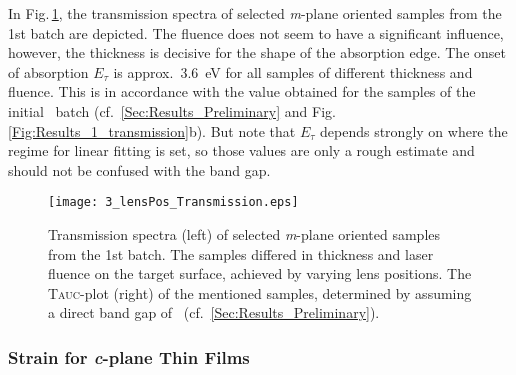 In Fig.\,\ref{Fig:Results_3_lensTransmission}, the transmission spectra of selected \textit{m}-plane oriented samples from the 1st batch are depicted.
The fluence does not seem to have a significant influence, however, the thickness is decisive for the shape of the absorption edge.
The onset of absorption $E_\tau$ is approx.\ \qty{3.6}{\eV} for all samples of different thickness and fluence.
This is in accordance with the value obtained for the samples of the initial \cro\ batch (cf.~\ref{Sec:Results_Preliminary} and Fig.\,\ref{Fig:Results_1_transmission}b).
But note that $E_\tau$ depends strongly on where the regime for linear fitting is set, so those values are only a rough estimate and should not be confused with the band gap.

\begin{figure}
    \centering
    \texttt{[image: 3\_lensPos\_Transmission.eps]}
    \caption{
        Transmission spectra (left) of selected \textit{m}-plane oriented samples from the 1st batch.
        The samples differed in thickness and laser fluence on the target surface, achieved by varying lens positions.
        The \textsc{Tauc}-plot (right) of the mentioned samples, determined by assuming a direct band gap of \cro\ (cf.~\ref{Sec:Results_Preliminary}).
    }
    \label{Fig:Results_3_lensTransmission}
\end{figure}

\subsubsection{Strain for \textit{c}-plane Thin Films}
    